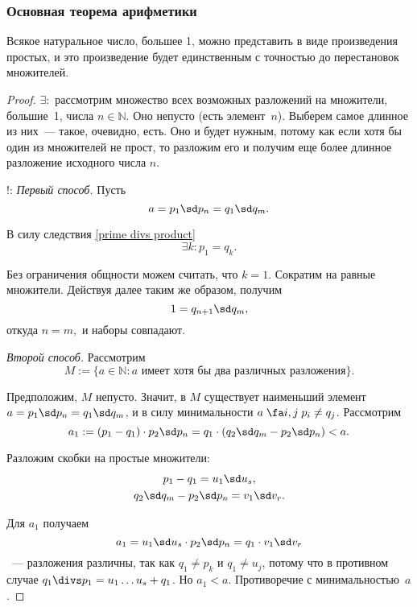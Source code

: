 \subsubsection{Основная теорема арифметики}

\begin{theorem}
  Всякое натуральное число, большее 1, можно представить в виде произведения простых, и это произведение будет единственным
  с точностью до перестановок множителей.
\end{theorem}
\begin{proof}
  $\exists:$ рассмотрим множество всех возможных разложений на множители, большие~1, числа $n \in \mathbb{N}$. Оно непусто (есть элемент~$n$).
  Выберем самое длинное из них~--- такое, очевидно, есть. Оно и будет нужным, потому как если хотя бы один из множителей не прост, то разложим его и получим еще более длинное разложение исходного числа $n$.
  \smallskip

  $!:$\,\textit{Первый способ.} Пусть
  $$
    a=p_1\sd p_n=q_1\sd q_m.
  $$
  
  В силу следствия \ref{prime divs product}
  $$
    \exi k\colon p_1=q_k.
  $$

  Без ограничения общности можем считать, что $k=1$. Сократим на равные множители. Действуя далее таким же образом, получим
  $$
    1=q_{n+1}\sd q_m,
  $$
  откуда $n=m,$ и наборы совпадают.
  \smallskip

  \textit{Второй способ.} Рассмотрим
  $$
    M:=\{a\in\mathbb{N}:a \text{ имеет хотя бы два различных разложения}\}.
  $$

  Предположим, $M$ непусто. Значит, в $M$ существует наименьший элемент $a=p_1\sd p_n=q_1\sd q_m$, и в силу минимальности
  $a\;\fa i,j\;p_i\neq q_j$. Рассмотрим
  $$
    a_1:=(p_1-q_1)\cdot p_2\sd p_n=q_1\cdot(q_2\sd q_m-p_2\sd p_n)<a.
  $$

  Разложим скобки на простые множители:
  \begin{gather*}
    p_1 - q_1 = u_1\sd u_s,\\
    q_2\sd q_m - p_2\sd p_n = v_1\sd v_r.
  \end{gather*}

  Для $a_1$ получаем
  $$
    a_1=u_1\sd u_s\cdot p_2\sd p_n=q_1\cdot v_1\sd v_r
  $$
  ~--- разложения различны, так как $q_1 \neq p_k$ и $q_1\neq u_j$, потому что в противном случае $q_1\divs p_1=u_1\ldots u_s+q_1$. Но $a_1 < a$. Противоречие с минимальностью~$a$.
\end{proof}
